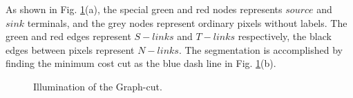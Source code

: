 \documentclass[journal]{IEEEtran}
\begin{document}
As shown in Fig. \ref{fig:graphcut}(a), the special green and red nodes represents $source$ and $sink$ terminals, and the grey nodes represent ordinary pixels without labels. The green and red edges represent $S-links$ and $T-links$ respectively, the black edges between pixels represent $N-links$. The segmentation is accomplished by finding the minimum cost cut as the blue dash line in Fig. \ref{fig:graphcut}(b).\par
\begin{figure}[!t]
	\centering
	\caption{Illumination of the Graph-cut.}
	\label{fig:graphcut}
\end{figure}

\end{document}
